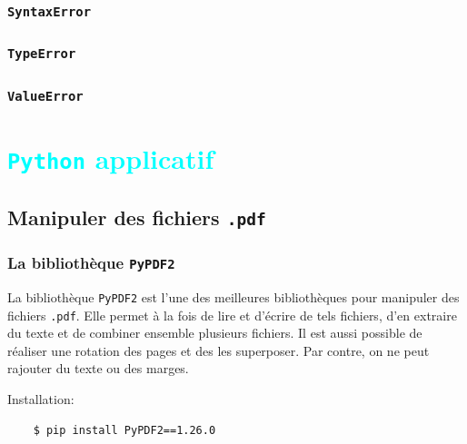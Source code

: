 \documentclass[a4paper,12pt]{book}
\begin{document}
\section{\texttt{SyntaxError}}
\section{\texttt{TypeError}}
\section{\texttt{ValueError}}
\medskip

\part{\textcolor{cyan}{\texttt{Python} applicatif}}
\chapter{Manipuler des fichiers \texttt{.pdf}}
\section{La bibliothèque \texttt{PyPDF2}}
La bibliothèque \texttt{PyPDF2} est l'une des meilleures bibliothèques pour manipuler des fichiers \texttt{.pdf}. Elle permet à la fois de lire et d'écrire de tels fichiers, d'en extraire du texte et de combiner ensemble plusieurs fichiers. Il est aussi possible de réaliser une rotation des pages et des les superposer. Par contre, on ne peut rajouter du texte ou des marges.
\medskip

Installation:
\begin{verbatim}
    $ pip install PyPDF2==1.26.0
\end{verbatim}
\medskip
\end{document}
